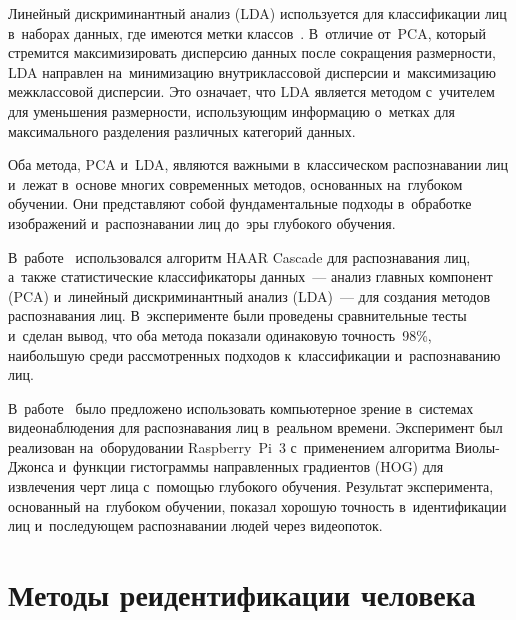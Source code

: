 Линейный дискриминантный анализ (LDA) используется для классификации лиц
в~наборах данных, где имеются метки классов~\cite{Lu2003faceLDA}.
В~отличие от~PCA, который стремится максимизировать дисперсию данных
после сокращения размерности, LDA направлен на~минимизацию
внутриклассовой дисперсии и~максимизацию межклассовой дисперсии. Это
означает, что LDA является методом с~учителем для уменьшения
размерности, использующим информацию о~метках для максимального
разделения различных категорий данных.

Оба метода, PCA и~LDA, являются важными в~классическом распознавании лиц
и~лежат в~основе многих современных методов, основанных на~глубоком
обучении. Они представляют собой фундаментальные подходы в~обработке
изображений и~распознавании лиц до~эры глубокого обучения.

В~работе~\cite{Karthick2021attendance} использовался алгоритм HAAR
Cascade для распознавания лиц, а~также статистические классификаторы
данных~--- анализ главных компонент (PCA) и~линейный дискриминантный
анализ (LDA)~--- для создания методов распознавания лиц.
В~эксперименте были проведены сравнительные тесты и~сделан вывод, что
оба метода показали одинаковую точность~98\%, наибольшую среди
рассмотренных подходов к~классификации и~распознаванию лиц.

В~работе~\cite{Saranya2020surveillance} было предложено использовать
компьютерное зрение в~системах видеонаблюдения для распознавания лиц
в~реальном времени. Эксперимент был реализован на~оборудовании
Raspberry~Pi~3 с~применением алгоритма Виолы-Джонса и~функции гистограммы
направленных градиентов (HOG) для извлечения черт лица с~помощью
глубокого обучения. Результат эксперимента, основанный на~глубоком
обучении, показал хорошую точность в~идентификации лиц и~последующем
распознавании людей через видеопоток.

\section{Методы реидентификации человека}\label{sec:ch1/reid}

